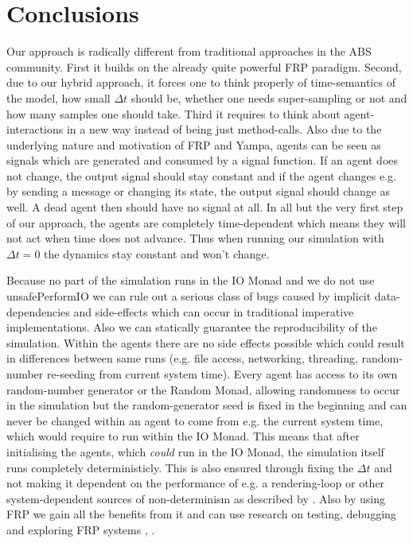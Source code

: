 \section{Conclusions}
\label{sec:conclusions}

Our approach is radically different from traditional approaches in the ABS community. First it builds on the already quite powerful FRP
paradigm. Second, due to our hybrid approach, it forces one to think properly of time-semantics of the model, how small $\Delta t$ should be, whether one needs super-sampling or not and how many samples one should take. Third it requires to think about agent-interactions in a new way instead of being just method-calls. Also due to the underlying nature and motivation of FRP and Yampa, agents can be seen as signals which are generated and consumed by a signal function. If an agent does not change, the output signal should stay constant and if the agent changes e.g. by sending a message or changing its state, the output signal should change as well. A dead agent then should have no signal at all. In all but the very first step of our approach, the agents are completely time-dependent which means they will not act when time does not advance. Thus when running our simulation with $\Delta t = 0$ the dynamics stay constant and won't change.

Because no part of the simulation runs in the IO Monad and we do not use unsafePerformIO we can rule out a serious class of bugs caused by implicit data-dependencies and side-effects which can occur in traditional imperative implementations. Also we can statically guarantee the reproducibility of the simulation. Within the agents there are no side effects possible which could result in differences between same runs (e.g. file access, networking, threading, random-number re-seeding from current system time). Every agent has access to its own random-number generator or the Random Monad, allowing randomness to occur in the simulation but the random-generator seed is fixed in the beginning and can never be changed within an agent to come from e.g. the current system time, which would require to run within the IO Monad. This means that after initialising the agents, which \textit{could} run in the IO Monad, the simulation itself runs completely deterministicly. This is also ensured through fixing the $\Delta t$ and not making it dependent on the performance of e.g. a rendering-loop or other system-dependent sources of non-determinism as described by \cite{perez_testing_2017}. Also by using FRP we gain all the benefits from it and can use research on testing, debugging and exploring FRP systems \cite{perez_testing_2017}, \cite{perez_back_2017}.

